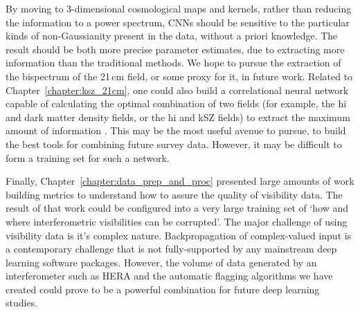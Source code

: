 By moving to 3-dimensional cosmological maps and kernels, rather than reducing the information to a power spectrum, CNNs should be sensitive to the particular kinds of non-Gaussianity present in the data, without a priori knowledge. The result should be both more precise parameter estimates, due to extracting more information than the traditional methods. We hope to pursue the extraction of the bispectrum of the 21\,cm field, or some proxy for it, in future work.
Related to Chapter~\ref{chapter:ksz_21cm}, one could also build a correlational neural network \citep{Chandar.15} capable of calculating the optimal combination of two fields (for example, the {\sc hi} and dark matter density fields, or the {\sc hi} and kSZ fields) to extract the maximum amount of information \citep{Feng.04}. This may be the most useful avenue to pursue, to build the best tools for combining future survey data. However, it may be difficult to form a training set for such a network.

Finally, Chapter~\ref{chapter:data_prep_and_proc} presented large amounts of work building metrics to understand how to assure the quality of visibility data. The result of that work could be configured into a very large training set of `how and where interferometric visibilities can be corrupted'. The major challenge of using visibility data is it's complex nature. Backpropagation of complex-valued input is a contemporary challenge \citep{Guberman.16, Popa.17complex, Zhang.17complex} that is not fully-supported by any mainstream deep learning software packages. However, the volume of data generated by an interferometer such as HERA and the automatic flagging algorithms we have created could prove to be a powerful combination for future deep learning studies.